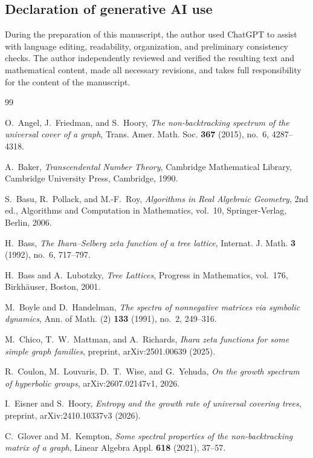 \documentclass[11pt]{amsart}
\theoremstyle{plain}
\theoremstyle{definition}
\theoremstyle{remark}
\begin{document}
\subsection*{Declaration of generative AI use}
During the preparation of this manuscript, the author used ChatGPT to assist with language editing, readability, organization, and preliminary consistency checks. The author independently reviewed and verified the resulting text and mathematical content, made all necessary revisions, and takes full responsibility for the content of the manuscript.
\begin{thebibliography}{99}

O.~Angel, J.~Friedman, and S.~Hoory,
\emph{The non-backtracking spectrum of the universal cover of a graph},
Trans. Amer. Math. Soc. \textbf{367} (2015), no.~6, 4287--4318.

A.~Baker,
\emph{Transcendental Number Theory},
Cambridge Mathematical Library, Cambridge University Press, Cambridge, 1990.

S.~Basu, R.~Pollack, and M.-F.~Roy,
\emph{Algorithms in Real Algebraic Geometry},
2nd ed., Algorithms and Computation in Mathematics, vol.~10,
Springer-Verlag, Berlin, 2006.

H.~Bass,
\emph{The Ihara--Selberg zeta function of a tree lattice},
Internat. J. Math. \textbf{3} (1992), no.~6, 717--797.

H.~Bass and A.~Lubotzky,
\emph{Tree Lattices},
Progress in Mathematics, vol.~176, Birkh\"auser, Boston, 2001.

M.~Boyle and D.~Handelman,
\emph{The spectra of nonnegative matrices via symbolic dynamics},
Ann. of Math. (2) \textbf{133} (1991), no.~2, 249--316.

M.~Chico, T.~W.~Mattman, and A.~Richards,
\emph{Ihara zeta functions for some simple graph families},
preprint, arXiv:2501.00639 (2025).

R.~Coulon, M.~Louvaris, D.~T.~Wise, and G.~Yehuda,
\emph{On the growth spectrum of hyperbolic groups},
arXiv:2607.02147v1, 2026.

I.~Eisner and S.~Hoory,
\emph{Entropy and the growth rate of universal covering trees},
preprint, arXiv:2410.10337v3 (2026).

C.~Glover and M.~Kempton,
\emph{Some spectral properties of the non-backtracking matrix of a graph},
Linear Algebra Appl. \textbf{618} (2021), 37--57.


\end{thebibliography}
\end{document}
